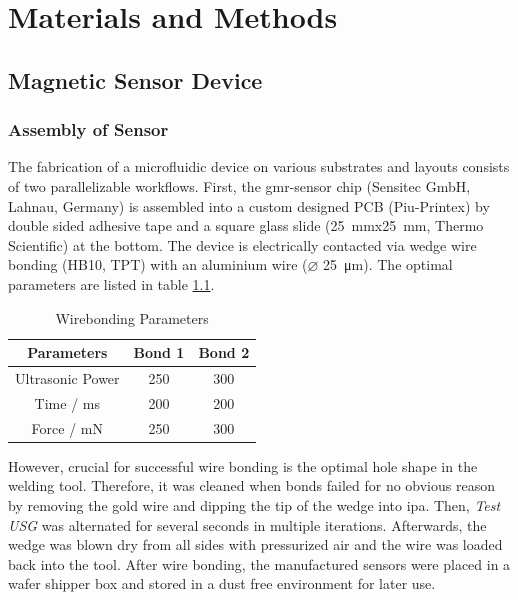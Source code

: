 \chapter{Materials and Methods}

\section{Magnetic Sensor Device} 
\subsection{Assembly of Sensor}
\label{sec:meth:sensor}
The fabrication of a microfluidic device on various substrates and layouts consists of two parallelizable workflows. First, the \gls{gmr}-sensor chip (Sensitec GmbH, Lahnau, Germany) is assembled into a custom designed PCB (Piu-Printex) by double sided adhesive tape and a square glass slide (\SI{25}{\milli\meter}x\SI{25}{\milli\meter}, Thermo Scientific) at the bottom. The device is electrically contacted via wedge wire bonding (HB10, TPT) with an aluminium wire ($\varnothing$ \SI{25}{\micro\meter}). The optimal parameters are listed in table \ref{tab:params_wirebonding}. 
\begin{table}[htb]
	\centering
\begin{tabularx}{.5\linewidth}{ccc}
	\toprule[1pt]
	Parameters & Bond 1 & Bond 2 \\
	\midrule
	Ultrasonic Power & 250 & 300 \\
	Time / ms & 200 & 200 \\
	Force / mN & 250 & 300 \\
	\bottomrule[1.2pt]
\end{tabularx}
\caption{Wirebonding Parameters}
\label{tab:params_wirebonding}
\end{table}
However, crucial for successful wire bonding is the optimal hole shape in the welding tool. Therefore, it was cleaned when bonds failed for no obvious reason by removing the gold wire and dipping the tip of the wedge into \gls{ipa}. Then, \textit{Test USG} was alternated for several seconds in multiple iterations. Afterwards, the wedge was blown dry from all sides with pressurized air and the wire was loaded back into the tool.
After wire bonding, the manufactured sensors were placed in a wafer shipper box and stored in a dust free environment for later use.

